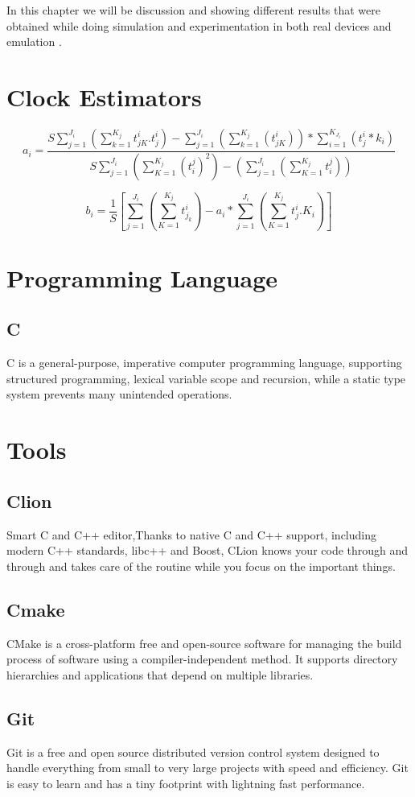In this chapter we will be discussion and showing different results that were obtained while doing simulation and experimentation in both real devices and emulation .

\section{Clock Estimators}

 $$a_{i} = \frac{S \sum^{J_{i}}_{j=1}(\sum^{K_{j}}_{k=1}t_{jK}^{i}.t^{i}_{j}) - \sum^{J_{i}}_{j=1}(\sum^{K_{j}}_{k=1}(t_{jK}^{i})) * \sum^{K_{J_{i}}}_{i=1}(t_{j}^{i}* k_{i})}{S \sum^{J_{i}}_{j=1}(\sum^{K_{j}}_{K=1} (t_{i}^{j})^{2}) - (\sum_{j=1}^{J_{i}}(\sum^{K_{j}}_{K=1} t_{i}^{j}))}
         $$


$$ b_{i} =  \frac{1}{S} [ \sum_{j=1}^{J_{i}}(\sum_{K=1}^{K_{j}} t_{j_{k}}^{i}) - a_{i} * \sum_{j=1}^{J_{i}}(\sum_{K=1}^{K_{j}}t_{j}^{i}.K_{i}) ]$$
\section{Programming Language}
\subsection{C}
C is a general-purpose, imperative computer programming language, supporting structured programming, lexical variable scope and recursion, while a static type system prevents many unintended operations.
\section{Tools}
\subsection{Clion}
Smart C and C++ editor,Thanks to native C and C++ support, including modern C++ standards, libc++ and Boost, CLion knows your code through and through and takes care of the routine while you focus on the important things.
\subsection{Cmake}
CMake is a cross-platform free and open-source software for managing the build process of software using a compiler-independent method. It supports directory hierarchies and applications that depend on multiple libraries.
\subsection{Git}
Git is a free and open source distributed version control system designed to handle everything from small to very large projects with speed and efficiency. Git is easy to learn and has a tiny footprint with lightning fast performance.


